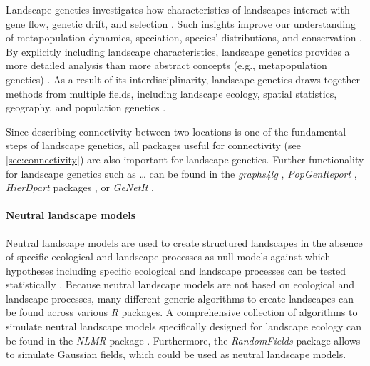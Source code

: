 \documentclass[smallextended]{svjour3}       %
\begin{document}
Landscape genetics investigates how characteristics of landscapes interact with gene flow, genetic drift, and selection \cite{Manel2003}.
Such insights improve our understanding of metapopulation dynamics, speciation, species' distributions, and conservation \cite{Storfer2007}.
By explicitly including landscape characteristics, landscape genetics provides a more detailed analysis than more abstract concepts (e.g., metapopulation genetics) \cite{Holderegger2006}.
As a result of its interdisciplinarity, landscape genetics draws together methods from multiple fields, including landscape ecology, spatial statistics, geography, and population genetics \cite{Storfer2007}.

Since describing connectivity between two locations is one of the fundamental steps of landscape genetics, all packages useful for connectivity (see \ref{sec:connectivity}) are also important for landscape genetics.
Further functionality for landscape genetics such as \ldots{} can be found in the \emph{graphs4lg} \cite{Savary2020}, \emph{PopGenReport} \cite{Adamack2014,Gruber2015}, \emph{HierDpart} packages \cite{Qin2019}, or \emph{GeNetIt} \cite{Murphy2010}.

\hypertarget{sec:NLM}{%
\paragraph{Neutral landscape models}\label{sec:NLM}}

Neutral landscape models are used to create structured landscapes in the absence of specific ecological and landscape processes as null models against which hypotheses including specific ecological and landscape processes can be tested statistically \cite{Gardner1987,With1997}.
Because neutral landscape models are not based on ecological and landscape processes, many different generic algorithms to create landscapes can be found across various \emph{R} packages.
A comprehensive collection of algorithms to simulate neutral landscape models specifically designed for landscape ecology can be found in the \emph{NLMR} package \cite{Sciaini2018}.
Furthermore, the \emph{RandomFields} package \cite{Schlather2015} allows to simulate Gaussian fields, which could be used as neutral landscape models.
\end{document}
